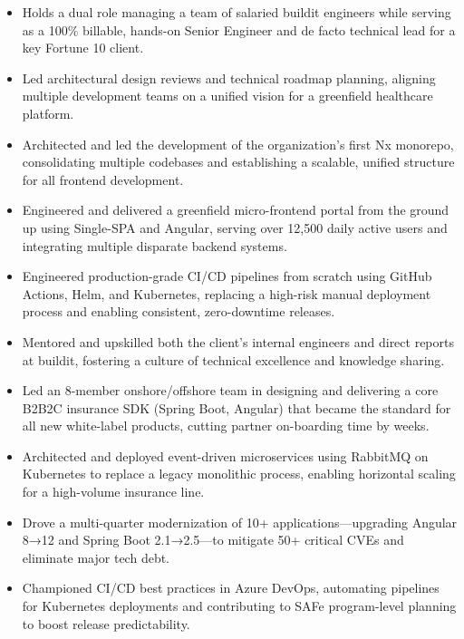 \begin{itemize}
    \item Holds a dual role managing a team of salaried buildit engineers while serving as a 100\% billable, hands-on Senior Engineer and de facto technical lead for a key Fortune 10 client.
    \item Led architectural design reviews and technical roadmap planning, aligning multiple development teams on a unified vision for a greenfield healthcare platform.
    \item Architected and led the development of the organization's first Nx monorepo, consolidating multiple codebases and establishing a scalable, unified structure for all frontend development.
    \item Engineered and delivered a greenfield micro-frontend portal from the ground up using Single-SPA and Angular, serving over 12,500 daily active users and integrating multiple disparate backend systems.
    \item Engineered production-grade CI/CD pipelines from scratch using GitHub Actions, Helm, and Kubernetes, replacing a high-risk manual deployment process and enabling consistent, zero-downtime releases.
    \item Mentored and upskilled both the client's internal engineers and direct reports at buildit, fostering a culture of technical excellence and knowledge sharing.
\end{itemize}
\vspace{\spacingBetweenJobs}

\begin{itemize}
    \item Led an 8-member onshore/offshore team in designing and delivering a core B2B2C insurance SDK (Spring Boot, Angular) that became the standard for all new white-label products, cutting partner on-boarding time by weeks.
    \item Architected and deployed event-driven microservices using RabbitMQ on Kubernetes to replace a legacy monolithic process, enabling horizontal scaling for a high-volume insurance line.
    \item Drove a multi-quarter modernization of 10+ applications—upgrading Angular 8→12 and Spring Boot 2.1→2.5—to mitigate 50+ critical CVEs and eliminate major tech debt.
    \item Championed CI/CD best practices in Azure DevOps, automating pipelines for Kubernetes deployments and contributing to SAFe program-level planning to boost release predictability.
\end{itemize}
\vspace{\spacingBetweenJobs}

